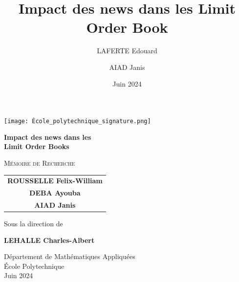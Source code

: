 \documentclass[12pt,a4paper]{article}
\title{\huge\textbf{Impact des news dans les Limit Order Book}}
\author{LAFERTE Edouard \and AIAD Janis}
\date{Juin 2024}
\theoremstyle{definition}
\theoremstyle{remark}
\begin{document}
    \begin{titlepage}
        \begin{center}
            \vspace*{2cm}
            
            \texttt{[image: École\_polytechnique\_signature.png]}
            

            
            {\huge\bfseries Impact des news dans les\\[0.4cm] 
            Limit Order Books\par}
            
            \vspace{2cm}
            
            {\Large\textsc{Mémoire de Recherche}\par}
            \vspace{1cm}
            
            {\large
            \begin{tabular}{c}
                \textbf{ROUSSELLE Felix-William}\\[0.2cm]
                \textbf{DEBA Ayouba}\\[0.2cm]
                \textbf{AIAD Janis}
            \end{tabular}\par}
            
            \vspace{1.5cm}
            
            {\large Sous la direction de\par}
            \vspace{0.4cm}
            {\large\textbf{LEHALLE Charles-Albert}\par}
            
            \vfill
            
            {\large Département de Mathématiques Appliquées\\
            École Polytechnique\\[0.4cm]
            Juin 2024\par}
        \end{center}
    \end{titlepage}

    \newpage
    \null
    \thispagestyle{empty}
    \newpage
\end{document}
